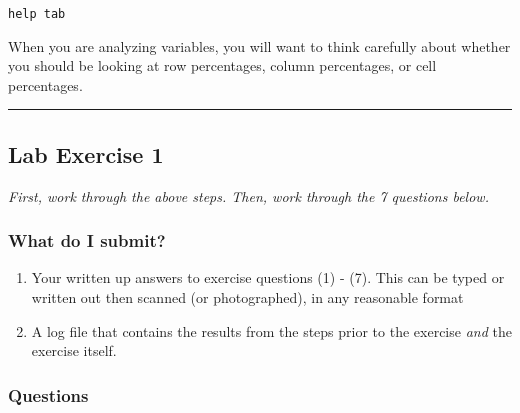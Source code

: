 \documentclass[
]{article}
\providecommand{\tightlist}{%
  \setlength{\itemsep}{0pt}\setlength{\parskip}{0pt}}
\begin{document}
\texttt{help\ tab}

When you are analyzing variables, you will want to think carefully about
whether you should be looking at row percentages, column percentages, or
cell percentages.

\begin{center}\rule{0.5\linewidth}{0.5pt}\end{center}

\hypertarget{lab-1}{%
\subsection*{Lab Exercise 1}\label{lab-1}}

\emph{First, work through the above steps. Then, work through the 7
questions below.}

\hypertarget{what-do-i-submit}{%
\subsubsection{What do I submit?}\label{what-do-i-submit}}

\begin{enumerate}
\def\labelenumi{\arabic{enumi}.}
\tightlist
\item
  Your written up answers to exercise questions (1) - (7). This can be
  typed or written out then scanned (or photographed), in any reasonable
  format
\item
  A log file that contains the results from the steps prior to the
  exercise \emph{and} the exercise itself.
\end{enumerate}

\hypertarget{questions}{%
\subsubsection{Questions}\label{questions}}
\end{document}
